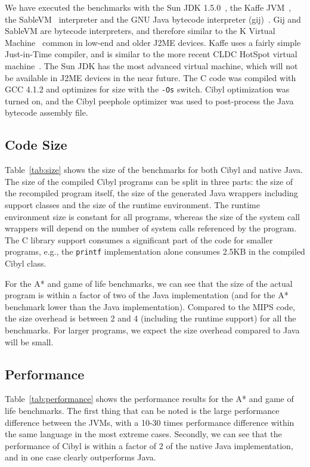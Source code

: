 We have executed the benchmarks with the Sun JDK 1.5.0~\cite{sunjdk}, the
Kaffe JVM~\cite{kaffe}, the SableVM~\cite{gagon03sablevm} interpreter and the
GNU Java bytecode interpreter (gij)~\cite{gcj}. Gij and SableVM are bytecode
interpreters, and therefore similar to the K Virtual Machine~\cite{sun00kvm}
common in low-end and older J2ME devices.  Kaffe uses a fairly simple
Just-in-Time compiler, and is similar to the more recent CLDC HotSpot virtual
machine~\cite{sun05cldchotspot}. The Sun JDK has the most advanced virtual
machine, which will not be available in J2ME devices in the near future. The C
code was compiled with GCC 4.1.2 and optimizes for size with the \texttt{-Os}
switch. Cibyl optimization was turned on, and the Cibyl peephole optimizer was
used to post-process the Java bytecode assembly file.

\subsection{Code Size}
Table~\ref{tab:size} shows the size of the benchmarks for both Cibyl and
native Java. The size of the compiled Cibyl programs can be split in three
parts: the size of the recompiled program itself, the size of the generated
Java wrappers including support classes and the size of the runtime
environment. The runtime environment size is constant for all programs,
whereas the size of the system call wrappers will depend on the number of
system calls referenced by the program. The C library support consumes a
significant part of the code for smaller programs, e.g., the \texttt{printf}
implementation alone consumes 2.5KB in the compiled Cibyl class.

For the A* and game of life benchmarks, we can see that the size of the actual
program is within a factor of two of the Java implementation (and for the A*
benchmark lower than the Java implementation). Compared to the MIPS code, the
size overhead is between 2 and 4 (including the runtime support) for all the
benchmarks. For larger programs, we expect the size overhead compared to Java
will be small.

\subsection{Performance}
Table~\ref{tab:performance} shows the performance results for the A* and game
of life benchmarks.  The first thing that can be noted is the large
performance difference between the JVMs, with a 10-30 times performance
difference within the same language in the most extreme cases. Secondly, we
can see that the performance of Cibyl is within a factor of 2 of the native
Java implementation, and in one case clearly outperforms Java.

